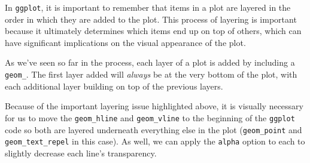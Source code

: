 \documentclass[
  letterpaper,
]{krantz}
\begin{document}
\begin{tcolorbox}[enhanced jigsaw, colback=white, leftrule=.75mm, breakable, colframe=quarto-callout-important-color-frame, bottomtitle=1mm, rightrule=.15mm, left=2mm, opacityback=0, bottomrule=.15mm, arc=.35mm, coltitle=black, colbacktitle=quarto-callout-important-color!10!white, toptitle=1mm, titlerule=0mm, title=\textcolor{quarto-callout-important-color}{\faExclamation}\hspace{0.5em}{Important}, toprule=.15mm, opacitybacktitle=0.6]

In \texttt{ggplot}, it is important to remember that items in a plot are
layered in the order in which they are added to the plot. This process
of layering is important because it ultimately determines which items
end up on top of others, which can have significant implications on the
visual appearance of the plot.

As we've seen so far in the process, each layer of a plot is added by
including a \texttt{geom\_}. The first layer added will \emph{always} be
at the very bottom of the plot, with each additional layer building on
top of the previous layers.

\end{tcolorbox}

Because of the important layering issue highlighted above, it is
visually necessary for us to move the \texttt{geom\_hline} and
\texttt{geom\_vline} to the beginning of the \texttt{ggplot} code so
both are layered underneath everything else in the plot
(\texttt{geom\_point} and \texttt{geom\_text\_repel} in this case). As
well, we can apply the \texttt{alpha} option to each to slightly
decrease each line's transparency.
\end{document}
